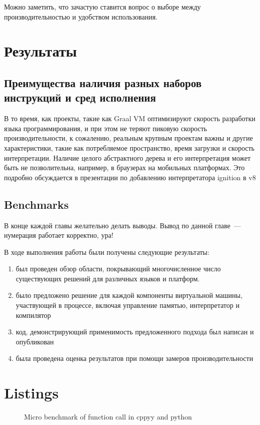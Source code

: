 \documentclass[times,specification,annotation]{itmo-student-thesis}
\begin{document}
\chapterconclusion
Можно заметить, что зачастую ставится вопрос о выборе между производительностью и удобством использования.

\chapter{Результаты}

\section{Преимущества наличия разных наборов инструкций и сред исполнения} \label{sec:why-not-graal}
В то время, как проекты, такие как Graal VM оптимизируют скорость разработки языка программирования, и при этом не теряют пиковую скорость производительности, к сожалению, реальным крупным проектам важны и другие характеристики, такие как потребляемое пространство, время загрузки и скорость интерпретации. Наличие целого абстрактного дерева и его интерпретация может быть не позволительна, например, в браузерах на мобильных платформах. Это подробно обсуждается в презентации по добавлению интерпретатора ignition в v8 \cite{ignition-iterpreter}

\section{Benchmarks}
\TODO

\chapterconclusion

В конце каждой главы желательно делать выводы. Вывод по данной главе~--- нумерация работает корректно, ура!

\startconclusionpage
В ходе выполнения работы были получены следующие результаты:
\begin{enumerate}
	\item был проведен обзор области, покрывающий многочисленное число существующих решений для различных языков и платформ.
	\item было предложено решение для каждой компоненты виртуальной машины, участвующей в процессе, включая управление памятью, интерпретатор и компилятор
	\item код, демонстрирующий применимость предложенного подхода был написан и опубликован
	\item была проведена оценка результатов при помощи замеров производительности\TODO
\end{enumerate}


\printmainbibliography

\appendix

\chapter{Listings}
\begin{figure}[!h]
	\caption{Micro benchmark of function call in cppyy and python}\label{apx:cppyy-bench}
	
\end{figure}
\end{document}
